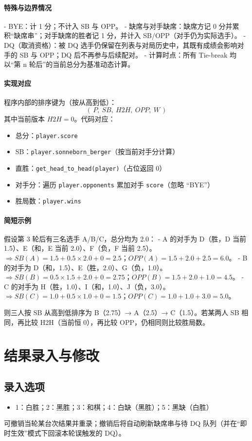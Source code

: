 \documentclass[12pt]{ctexart}
\begin{document}
\paragraph{特殊与边界情况}
- BYE：计 1 分；不计入 SB 与 OPP。  
- 缺席与对手缺席：缺席方记 0 分并累积“缺席串”；对手缺席的胜者记 1 分，并计入 SB/OPP（对手仍为实际选手）。  
- DQ（取消资格）：被 DQ 选手仍保留在列表与对局历史中，其既有成绩会影响对手的 SB 与 OPP；DQ 后不再参与后续配对。  
- 计算时点：所有 Tie-break 均以“第 n 轮后”的当前总分为基准动态计算。

\paragraph{实现对应}
程序内部的排序键为（按从高到低）：
\[(\,P,\ SB,\ H2H,\ OPP,\ W\,)\]
其中当前版本 \(H2H=0\)。代码对应：
\begin{itemize}[leftmargin=1.6em]
  \item 总分：\verb|player.score|
  \item SB：\verb|player.sonneborn_berger|（按当前对手分计算）
  \item 直胜：\verb|get_head_to_head(player)|（占位返回 0）
  \item 对手分：遍历 \verb|player.opponents| 累加对手 \verb|score|（忽略 “BYE”）
  \item 胜局数：\verb|player.wins|
\end{itemize}

\paragraph{简短示例}
假设第 3 轮后有三名选手 A/B/C，总分均为 2.0：  
- A 的对手为 D（胜，D 当前 1.5）、E（和，E 当前 2.0）、F（负，F 当前 2.5）。  
  \(\Rightarrow SB(A)=1.5 + 0.5\times 2.0 + 0 = 2.5\)；\(OPP(A)=1.5+2.0+2.5=6.0\)。  
- B 的对手为 D（和，1.5）、E（胜，2.0）、G（负，1.0）。  
  \(\Rightarrow SB(B)=0.5\times1.5 + 2.0 + 0 = 2.75\)；\(OPP(B)=1.5+2.0+1.0=4.5\)。  
- C 的对手为 H（胜，1.0）、I（和，1.0）、J（负，3.0）。  
  \(\Rightarrow SB(C)=1.0 + 0.5\times1.0 + 0 = 1.5\)；\(OPP(C)=1.0+1.0+3.0=5.0\)。  

则三人按 SB 从高到低排序为 B（2.75）→ A（2.5）→ C（1.5）。若某两人 SB 相同，再比较 H2H（当前恒 0），再比较 OPP，仍相同则比较胜局数。

\section{结果录入与修改}
\subsection*{录入选项}
\begin{itemize}[leftmargin=1.6em]
  \item 1：白胜；2：黑胜；3：和棋；4：白缺（黑胜）；5：黑缺（白胜）
\end{itemize}
可撤销当轮某台次结果并重录；撤销后将自动刷新缺席串与待 DQ 队列（并在“即时生效”模式下回滚本轮误触发的 DQ）。
\end{document}

